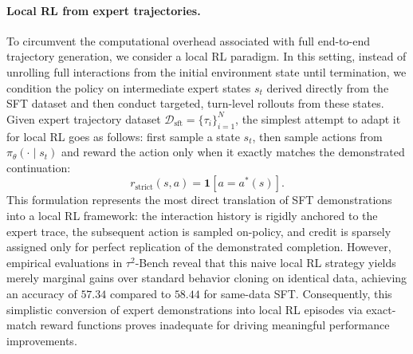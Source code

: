 \paragraph{Local RL from expert trajectories.}
To circumvent the computational overhead associated with full end-to-end trajectory generation, we consider a local RL paradigm. In this setting, instead of unrolling full interactions from the initial environment state until termination, we condition the policy on intermediate expert states $s_t$ derived directly from the SFT dataset and then conduct targeted, turn-level rollouts from these states. Given expert trajectory dataset $\mathcal{D}_{\mathrm{sft}}=\{\tau_i\}_{i=1}^N$, the simplest attempt to adapt it for local RL goes as follows: first sample a state $s_t$, then sample actions from $\pi_{\theta}(\cdot \mid s_t)$ and reward the action only when it exactly matches the demonstrated continuation:
\begin{equation}
r_{\mathrm{strict}}(s,a)=\mathbf{1}[a=a^*(s)].
\label{eq:strict_reward}
\end{equation}
This formulation represents the most direct translation of SFT demonstrations into a local RL framework: the interaction history is rigidly anchored to the expert trace, the subsequent action is sampled on-policy, and credit is sparsely assigned only for perfect replication of the demonstrated completion. However, empirical evaluations in $\tau^2$-Bench reveal that this naive local RL strategy yields merely marginal gains over standard behavior cloning on identical data, achieving an accuracy of $57.34$ compared to $58.44$ for same-data SFT. Consequently, this simplistic conversion of expert demonstrations into local RL episodes via exact-match reward functions proves inadequate for driving meaningful performance improvements.


